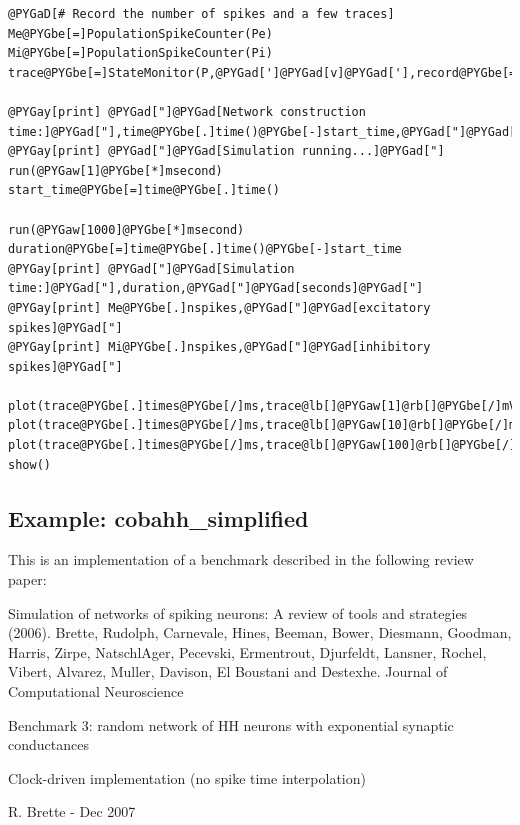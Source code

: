 \documentclass[letterpaper,10pt]{manual}
\begin{document}
\begin{Verbatim}[commandchars=@\[\]]
@PYGaD[# Record the number of spikes and a few traces]
Me@PYGbe[=]PopulationSpikeCounter(Pe)
Mi@PYGbe[=]PopulationSpikeCounter(Pi)
trace@PYGbe[=]StateMonitor(P,@PYGad[']@PYGad[v]@PYGad['],record@PYGbe[=]@lb[]@PYGaw[1],@PYGaw[10],@PYGaw[100]@rb[])

@PYGay[print] @PYGad["]@PYGad[Network construction time:]@PYGad["],time@PYGbe[.]time()@PYGbe[-]start_time,@PYGad["]@PYGad[seconds]@PYGad["]
@PYGay[print] @PYGad["]@PYGad[Simulation running...]@PYGad["]
run(@PYGaw[1]@PYGbe[*]msecond)
start_time@PYGbe[=]time@PYGbe[.]time()

run(@PYGaw[1000]@PYGbe[*]msecond)
duration@PYGbe[=]time@PYGbe[.]time()@PYGbe[-]start_time
@PYGay[print] @PYGad["]@PYGad[Simulation time:]@PYGad["],duration,@PYGad["]@PYGad[seconds]@PYGad["]
@PYGay[print] Me@PYGbe[.]nspikes,@PYGad["]@PYGad[excitatory spikes]@PYGad["]
@PYGay[print] Mi@PYGbe[.]nspikes,@PYGad["]@PYGad[inhibitory spikes]@PYGad["]

plot(trace@PYGbe[.]times@PYGbe[/]ms,trace@lb[]@PYGaw[1]@rb[]@PYGbe[/]mV)
plot(trace@PYGbe[.]times@PYGbe[/]ms,trace@lb[]@PYGaw[10]@rb[]@PYGbe[/]mV)
plot(trace@PYGbe[.]times@PYGbe[/]ms,trace@lb[]@PYGaw[100]@rb[]@PYGbe[/]mV)
show()
\end{Verbatim}

\resetcurrentobjects
{}

\hypertarget{index-29}{}\subsection{Example: cobahh\_simplified}

This is an implementation of a benchmark described
in the following review paper:

Simulation of networks of spiking neurons: A review of tools and strategies (2006).
Brette, Rudolph, Carnevale, Hines, Beeman, Bower, Diesmann, Goodman, Harris, Zirpe,
NatschlAger, Pecevski, Ermentrout, Djurfeldt, Lansner, Rochel, Vibert, Alvarez, Muller,
Davison, El Boustani and Destexhe.
Journal of Computational Neuroscience

Benchmark 3: random network of HH neurons with exponential synaptic conductances

Clock-driven implementation
(no spike time interpolation)

R. Brette - Dec 2007
\end{document}
